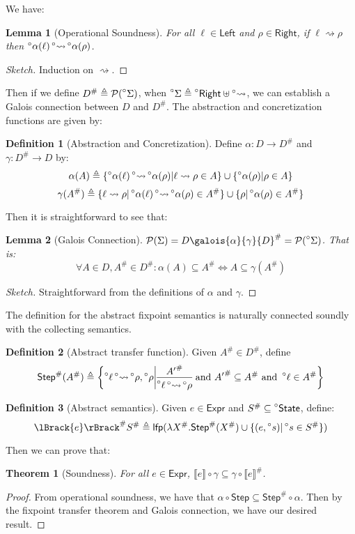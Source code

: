 \documentclass[acmsmall,review]{acmart}\settopmatter{printfolios=true,printccs=false,printacmref=false}
\theoremstyle{definition}
\newtheorem{defn}{Definition}[section]
\theoremstyle{plain}
\newtheorem{lem}{Lemma}[section]
\newtheorem{thm}{Theorem}[section]
\newcommand*{\pset}{\mathcal{P}}
\newcommand*{\A}[1]{\prescript{\circ}{}{#1}}
\newcommand*{\Abs}[1]{{#1}^{\#}}
\newcommand*{\Expr}{\mathsf{Expr}}
\newcommand*{\Left}{\mathsf{Left}}
\newcommand*{\Right}{\mathsf{Right}}
\newcommand*{\State}{\mathsf{State}}
\newcommand*{\lfp}{\mathsf{lfp}}
\newcommand*{\Step}{\mathsf{Step}}
\newcommand*{\semarrow}{\rightsquigarrow}
\newcommand*{\asemarrow}{\A{\rightsquigarrow}}
\newcommand*{\sembracket}[1]{\lBrack{#1}\rBrack}
\begin{document}
We have:
\begin{lem}[Operational Soundness]
  For all $\ell\in\Left$ and $\rho\in\Right$, if $\ell\semarrow\rho$ then $\A\alpha(\ell)\A\semarrow\A\alpha(\rho)$.
\end{lem}
\begin{proof}[Sketch]
  Induction on $\semarrow$.
\end{proof}

Then if we define $\Abs{D}\triangleq\pset(\A\Sigma)$, when $\A\Sigma\triangleq\A\Right\uplus\A\semarrow$, we can establish a Galois connection between $D$ and $\Abs{D}$.
The abstraction and concretization functions are given by:
\begin{defn}[Abstraction and Concretization]
  Define $\alpha:D\rightarrow\Abs{D}$ and $\gamma:\Abs{D}\rightarrow D$ by:
  \[
    \alpha(A)\triangleq\{\A\alpha(\ell)\asemarrow\A\alpha(\rho)|\ell\semarrow\rho\in A\}\cup\{\A\alpha(\rho)|\rho\in A\}
  \]
  \[
    \gamma(\Abs{A})\triangleq\{\ell\semarrow\rho|\A\alpha(\ell)\asemarrow\A\alpha(\rho)\in\Abs{A}\}\cup\{\rho|\A\alpha(\rho)\in\Abs{A}\}
  \]
\end{defn}

Then it is straightforward to see that:
\begin{lem}[Galois Connection]
  $\pset(\Sigma)=D\galois{\alpha}{\gamma}\Abs{D}=\pset(\A\Sigma)$. That is:
  \[\forall A\in D,\Abs{A}\in\Abs{D}:\alpha(A)\subseteq\Abs{A}\Leftrightarrow A\subseteq\gamma(\Abs{A})\]
\end{lem}
\begin{proof}[Sketch]
  Straightforward from the definitions of $\alpha$ and $\gamma$.
\end{proof}

The definition for the abstract fixpoint semantics is naturally connected soundly with the collecting semantics.
\begin{defn}[Abstract transfer function]
  Given $\Abs{A}\in\Abs{D}$, define
  \[
    \Abs{\mathsf{Step}}(\Abs{A})\triangleq
    \left\{\A\ell\A\semarrow\A\rho, \A\rho\middle|
    \begin{prooftree}[center=true]
      \hypo{\Abs{A'}}\infer1{\A\ell\A\semarrow\A\rho}
    \end{prooftree}\text{ and }
    \Abs{A'}\subseteq \Abs{A}\text{ and }\A\ell\in\Abs{A}
    \right\}
  \]
\end{defn}
\begin{defn}[Abstract semantics]
  Given $e\in\Expr$ and $\Abs{S}\subseteq\A\State$, define:
  \[
    \Abs{\sembracket{e}}\Abs{S}\triangleq\lfp(\lambda \Abs{X}.\Abs{\mathsf{Step}}(\Abs{X})\cup\{(e,\A{s})|\A{s}\in \Abs{S}\})
  \]
\end{defn}
Then we can prove that:
\begin{thm}[Soundness]
  For all $e\in\Expr$, $\sembracket{e}\circ\gamma\subseteq\gamma\circ\Abs{\sembracket{e}}$.
\end{thm}
\begin{proof}
  From operational soundness, we have that $\alpha\circ\Step\subseteq\Abs\Step\circ\alpha$.
  Then by the fixpoint transfer theorem and Galois connection, we have our desired result.
\end{proof}
\end{document}
